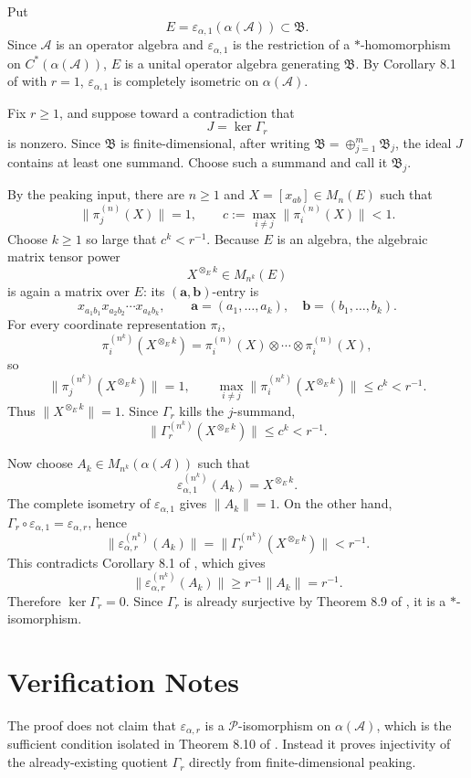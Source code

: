 \documentclass[11pt]{article}
\newcommand{\A}{\mathcal A}
\newcommand{\B}{\mathfrak B}
\newcommand{\eps}{\varepsilon}
\begin{document}
Put
\[
  E=\eps_{\alpha,1}(\alpha(\A))\subset \B .
\]
Since \(\A\) is an operator algebra and \(\eps_{\alpha,1}\) is the restriction
of a \(*\)-homomorphism on \(C^*(\alpha(\A))\), \(E\) is a unital operator
algebra generating \(\B\). By Corollary 8.1 of \cite{CR} with \(r=1\),
\(\eps_{\alpha,1}\) is completely isometric on \(\alpha(\A)\).

Fix \(r\geq 1\), and suppose toward a contradiction that
\[
  J=\ker\Gamma_r
\]
is nonzero. Since \(\B\) is finite-dimensional, after writing
\(\B=\oplus_{j=1}^m \B_j\), the ideal \(J\) contains at least one summand. Choose
such a summand and call it \(\B_j\).

By the peaking input, there are \(n\geq 1\) and \(X=[x_{ab}]\in M_n(E)\) such
that
\[
  \|\pi_j^{(n)}(X)\|=1,
  \qquad
  c:=\max_{i\ne j}\|\pi_i^{(n)}(X)\|<1.
\]
Choose \(k\geq 1\) so large that \(c^k<r^{-1}\).
Because \(E\) is an algebra, the algebraic matrix tensor power
\[
  X^{\otimes_E k}\in M_{n^k}(E)
\]
is again a matrix over \(E\): its \((\mathbf a,\mathbf b)\)-entry is
\[
  x_{a_1b_1}x_{a_2b_2}\cdots x_{a_kb_k},
  \qquad
  \mathbf a=(a_1,\ldots,a_k),\quad
  \mathbf b=(b_1,\ldots,b_k).
\]
For every coordinate representation \(\pi_i\),
\[
  \pi_i^{(n^k)}(X^{\otimes_E k})
   = \pi_i^{(n)}(X)\otimes\cdots\otimes\pi_i^{(n)}(X),
\]
so
\[
  \|\pi_j^{(n^k)}(X^{\otimes_E k})\|=1,
  \qquad
  \max_{i\ne j}\|\pi_i^{(n^k)}(X^{\otimes_E k})\|\leq c^k<r^{-1}.
\]
Thus \(\|X^{\otimes_E k}\|=1\). Since \(\Gamma_r\) kills the \(j\)-summand,
\[
  \|\Gamma_r^{(n^k)}(X^{\otimes_E k})\|\leq c^k<r^{-1}.
\]

Now choose \(A_k\in M_{n^k}(\alpha(\A))\) such that
\[
  \eps_{\alpha,1}^{(n^k)}(A_k)=X^{\otimes_E k}.
\]
The complete isometry of \(\eps_{\alpha,1}\) gives \(\|A_k\|=1\). On the other
hand, \(\Gamma_r\circ\eps_{\alpha,1}=\eps_{\alpha,r}\), hence
\[
  \|\eps_{\alpha,r}^{(n^k)}(A_k)\|
    = \|\Gamma_r^{(n^k)}(X^{\otimes_E k})\|
    < r^{-1}.
\]
This contradicts Corollary 8.1 of \cite{CR}, which gives
\[
  \|\eps_{\alpha,r}^{(n^k)}(A_k)\|\geq r^{-1}\|A_k\|=r^{-1}.
\]
Therefore \(\ker\Gamma_r=0\). Since \(\Gamma_r\) is already surjective by
Theorem 8.9 of \cite{CR}, it is a \(*\)-isomorphism.

\section*{Verification Notes}

The proof does not claim that \(\eps_{\alpha,r}\) is a \(\mathcal P\)-isomorphism
on \(\alpha(\A)\), which is the sufficient condition isolated in Theorem 8.10 of
\cite{CR}. Instead it proves injectivity of the already-existing quotient
\(\Gamma_r\) directly from finite-dimensional peaking.
\end{document}
